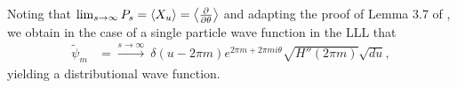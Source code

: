 \documentclass[notas.tex]{subfiles} 				%
\begin{document}
Noting that $\lim_{s \to \infty} P_s =  \langle X_u \rangle = \left \langle \frac{\partial }{\partial \theta} \right \rangle$ and adapting the proof of Lemma 3.7 of \cite{baier_toric_2011}, we obtain in the case of a single particle wave function in the LLL that 
\begin{align*} \label{eq_cyl_limit}
	\tilde \psi_m &= \xrightarrow{s\to\infty} ~ \delta(u-2\pi m) e^{2 \pi m + 2 \pi m i \theta} \sqrt{H''(2\pi m)}\sqrt{du}, \nonumber
\end{align*}
yielding a distributional wave function.


\end{document}
